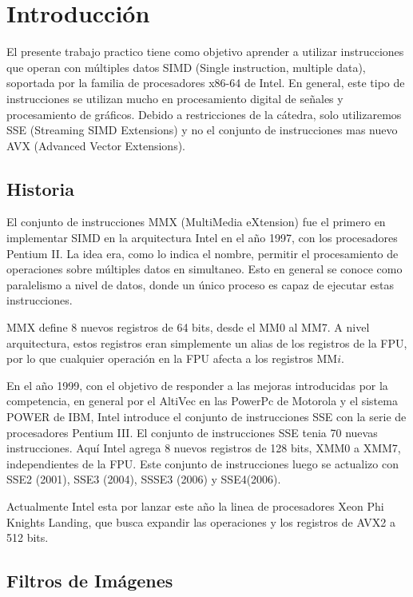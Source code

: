 \section{Introducción}

El presente trabajo practico tiene como objetivo aprender a utilizar instrucciones que operan con múltiples datos SIMD (Single instruction, multiple data), soportada por la familia de procesadores x86-64 de Intel. En general, este tipo de instrucciones se utilizan mucho en procesamiento digital de señales y procesamiento de gráficos. Debido a restricciones de la cátedra, solo utilizaremos SSE (Streaming SIMD Extensions) y no el conjunto de instrucciones mas nuevo AVX (Advanced Vector Extensions).
 
\subsection{Historia}
 
El conjunto de instrucciones MMX (MultiMedia eXtension) fue el primero en implementar SIMD en la arquitectura Intel en el año 1997, con los procesadores Pentium II. La idea era, como lo indica el nombre, permitir el procesamiento de operaciones sobre múltiples datos en simultaneo. Esto en general se conoce como paralelismo a nivel de datos, donde un único proceso es capaz de ejecutar estas instrucciones.

MMX define 8 nuevos registros de 64 bits, desde el MM0 al MM7. A nivel arquitectura, estos registros eran simplemente un alias de los registros de la FPU, por lo que cualquier operación en la FPU afecta a los registros MM$i$.

En el año 1999, con el objetivo de responder a las mejoras introducidas por la competencia, en general por el AltiVec en las PowerPc de Motorola y el sistema POWER de IBM, Intel introduce el conjunto de instrucciones SSE con la serie de procesadores Pentium III. El conjunto de instrucciones SSE tenia 70 nuevas instrucciones. Aquí Intel agrega 8 nuevos registros de 128 bits, XMM0 a XMM7, independientes de la FPU. Este conjunto de instrucciones luego se actualizo con SSE2 (2001), SSE3 (2004), SSSE3 (2006) y SSE4(2006).

Actualmente Intel esta por lanzar este año la linea de procesadores Xeon Phi Knights Landing, que busca expandir las operaciones y los registros de AVX2 a 512 bits.

\subsection{Filtros de Imágenes}

